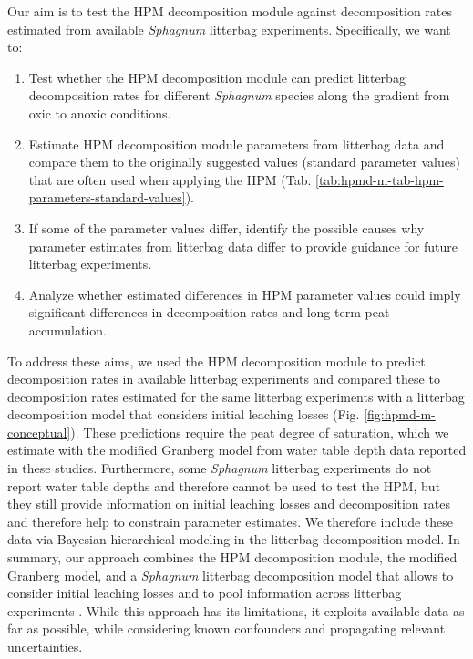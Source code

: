 \documentclass[esd, manuscript]{copernicus}
\begin{document}
Our aim is to test the HPM decomposition module against decomposition rates estimated from available \emph{Sphagnum} litterbag experiments. Specifically, we want to:

\begin{enumerate}
\def\labelenumi{\arabic{enumi}.}
\item
  Test whether the HPM decomposition module can predict litterbag decomposition rates for different \emph{Sphagnum} species along the gradient from oxic to anoxic conditions.
\item
  Estimate HPM decomposition module parameters from litterbag data and compare them to the originally suggested values (standard parameter values) \citep{Frolking.2010} that are often used when applying the HPM (Tab. \ref{tab:hpmd-m-tab-hpm-parameters-standard-values}).
\item
  If some of the parameter values differ, identify the possible causes why parameter estimates from litterbag data differ to provide guidance for future litterbag experiments.
\item
  Analyze whether estimated differences in HPM parameter values could imply significant differences in decomposition rates and long-term peat accumulation.
\end{enumerate}

To address these aims, we used the HPM decomposition module to predict decomposition rates in available litterbag experiments and compared these to decomposition rates estimated for the same litterbag experiments with a litterbag decomposition model that considers initial leaching losses \citep{Teickner.2025} (Fig. \ref{fig:hpmd-m-conceptual}). These predictions require the peat degree of saturation, which we estimate with the modified Granberg model \citep{Granberg.1999, Kettridge.2007} from water table depth data reported in these studies. Furthermore, some \emph{Sphagnum} litterbag experiments do not report water table depths and therefore cannot be used to test the HPM, but they still provide information on initial leaching losses and decomposition rates and therefore help to constrain parameter estimates. We therefore include these data via Bayesian hierarchical modeling in the litterbag decomposition model. In summary, our approach combines the HPM decomposition module, the modified Granberg model, and a \emph{Sphagnum} litterbag decomposition model that allows to consider initial leaching losses and to pool information across litterbag experiments \citep{Teickner.2025}. While this approach has its limitations, it exploits available data as far as possible, while considering known confounders and propagating relevant uncertainties.
\end{document}

